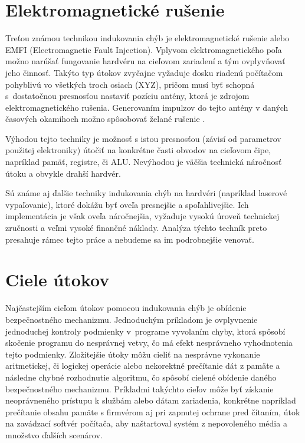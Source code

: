 \section{Elektromagnetické rušenie}
Treťou známou technikou indukovania chýb je elektromagnetické rušenie alebo EMFI (Electromagnetic Fault Injection). Vplyvom elektromagnetického poľa možno narúšať fungovanie hardvéru na cieľovom zariadení a tým ovplyvňovať jeho činnosť. Takýto typ útokov zvyčajne vyžaduje dosku riadenú počítačom pohyblivú vo všetkých troch osiach (XYZ), pričom musí byť schopná s~dostatočnou presnosťou nastaviť pozíciu antény, ktorá je zdrojom elektromagnetického rušenia. Generovaním impulzov do tejto antény v daných časových okamihoch možno spôsobovať želané rušenie \cite{emfi}.

Výhodou tejto techniky je možnosť s istou presnosťou (závisí od parametrov použitej elektroniky) útočiť na konkrétne časti obvodov na cieľovom čipe, napríklad pamäť, registre, či ALU. Nevýhodou je väčšia technická náročnosť útoku a obvykle drahší hardvér.

Sú známe aj ďalšie techniky indukovania chýb na hardvéri (napríklad laserové vypaľovanie), ktoré dokážu byť oveľa presnejšie a spoľahlivejšie. Ich implementácia je však oveľa náročnejšia, vyžaduje vysokú úroveň technickej zručnosti a veľmi vysoké finančné náklady. Analýza týchto techník preto presahuje rámec tejto práce a nebudeme sa im podrobnejšie venovať.

\section{Ciele útokov}
Najčastejším cieľom útokov pomocou indukovania chýb je obídenie bezpečnostného mechanizmu. Jednoduchým príkladom je ovplyvnenie jednoduchej kontroly podmienky v~programe vyvolaním chyby, ktorá spôsobí skočenie programu do nesprávnej vetvy, čo má efekt nesprávneho vyhodnotenia tejto podmienky. Zložitejšie útoky môžu cieliť na nesprávne vykonanie aritmetickej, či logickej operácie alebo nekorektné prečítanie dát z pamäte a následne chybné rozhodnutie algoritmu, čo spôsobí cielené obídenie daného bezpečnostného mechanizmu. Príkladmi takýchto cieľov môže byť získanie neoprávneného prístupu k službám alebo dátam zariadenia, konkrétne napríklad prečítanie obsahu pamäte s firmvérom aj pri zapnutej ochrane pred čítaním, útok na zavádzací softvér počítača, aby naštartoval systém z nepovoleného média a množstvo ďalších scenárov.

